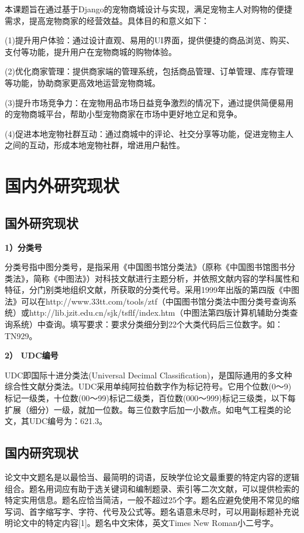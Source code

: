 本课题旨在通过基于Django的宠物商城设计与实现，满足宠物主人对购物的便捷需求，提高宠物商家的经营效益。具体目的和意义如下：

(1)提升用户体验：通过设计直观、易用的UI界面，提供便捷的商品浏览、购买、支付等功能，提升用户在宠物商城的购物体验。

(2)优化商家管理：提供商家端的管理系统，包括商品管理、订单管理、库存管理等功能，协助商家更高效地运营宠物商城。

(3)提升市场竞争力：在宠物用品市场日益竞争激烈的情况下，通过提供简便易用的宠物商城平台，帮助小型宠物商家在市场中更好地立足和竞争。

(4)促进本地宠物社群互动：通过商城中的评论、社交分享等功能，促进宠物主人之间的互动，形成本地宠物社群，增进用户黏性。


\section{国内外研究现状}
\subsection{国外研究现状}
\textbf{1）分类号}

分类号指中图分类号，是指采用《中国图书馆分类法》（原称《中国图书馆图书分类法》，简称《中图法》）对科技文献进行主题分析，并依照文献内容的学科属性和特征，分门别类地组织文献，所获取的分类代号。采用1999年出版的第四版《中图法》可以在http://www.33tt.com/tools/ztf（中国图书馆分类法中图分类号查询系统）或http://lib.jzit.edu.cn/sjk/tsflf/index.htm（中图法第四版计算机辅助分类查询系统）中查询。填写要求：要求分类细分到22个大类代码后三位数字。如：TN929。

\textbf{2） UDC编号	}

UDC即国际十进分类法(Universal Decimal Classification)，是国际通用的多文种综合性文献分类法。UDC采用单纯阿拉伯数字作为标记符号。它用个位数(0～9)标记一级类，十位数(00～99)标记二级类，百位数(000～999)标记三级类，以下每扩展（细分）一级，就加一位数。每三位数字后加一小数点。如电气工程类的论文，其UDC编号为：621.3。


\subsection{国内研究现状}
论文中文题名是以最恰当、最简明的词语，反映学位论文最重要的特定内容的逻辑组合。题名用词应有助于选关键词和编制题录、索引等二次文献，可以提供检索的特定实用信息。题名应恰当简洁，一般不超过25个字。题名应避免使用不常见的缩写词、首字缩写字、字符、代号及公式等。题名语意未尽时，可以用副标题补充说明论文中的特定内容[1]。题名中文宋体，英文Times New Roman小二号字。


